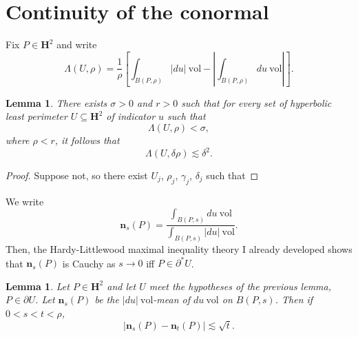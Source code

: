 \documentclass[reqno,12pt,letterpaper]{amsart}
\newcommand{\Hyp}{\mathbf H}
\newcommand{\normal}{\mathbf n}
\newcommand{\vol}{\mathrm{vol}}
\newtheorem{lemma}[theorem]{Lemma}
\theoremstyle{definition}
\numberwithin{equation}{section}
\begin{document}
\section{Continuity of the conormal}
Fix $P \in \Hyp^2$ and write
$$\Lambda(U, \rho) = \frac{1}{\rho}\left[\int_{B(P, \rho)} |du| ~\vol - \left|\int_{B(P, \rho)} du ~\vol\right|\right].$$

\begin{lemma}
There exists $\sigma > 0$ and $r > 0$ such that for every set of hyperbolic least perimeter $U \subseteq \Hyp^2$ of indicator $u$ such that
$$\Lambda(U, \rho) < \sigma,$$
where $\rho < r$,
it follows that
$$\Lambda(U, \delta \rho) \lesssim \delta^2.$$
\end{lemma}
\begin{proof}
Suppose not, so there exist $U_j$, $\rho_j$, $\gamma_j$, $\delta_j$ such that
\end{proof}

We write
$$\normal_s(P) = \frac{\int_{B(P, s)} du ~\vol}{\int_{B(P, s)} |du| ~\vol}.$$
Then, the Hardy-Littlewood maximal inequality theory I already developed shows that $\normal_s(P)$ is Cauchy as $s \to 0$ iff $P \in \partial^* U$.

\begin{lemma}
Let $P \in \Hyp^2$ and let $U$ meet the hypotheses of the previous lemma, $P \in \partial U$.
Let $\normal_s(P)$ be the $|du|~\vol$-mean of $du~\vol$ on $B(P, s)$. Then if $0 < s < t < \rho$,
$$|\normal_s(P) - \normal_t(P)| \lesssim \sqrt t.$$
\end{lemma}



\printbibliography
\end{document}
